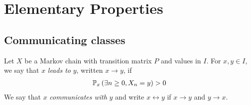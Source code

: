 \section{Elementary Properties}

\subsection{Communicating classes}
\begin{definition}[Communication]
	Let $X$ be a Markov chain with transition matrix $P$ and values in $I$.
	For $x, y \in I$, we say that $x$ \textit{leads to} $y$, written $x \to y$, if
	\begin{align*}
		\mathbb{P}_{x}\left({\exists n \geq 0, X_n = y}\right) > 0
	\end{align*}
	We say that $x$ \textit{communicates with} $y$ and write $x \leftrightarrow y$ if $x \to y$ and $y \to x$.
\end{definition}

